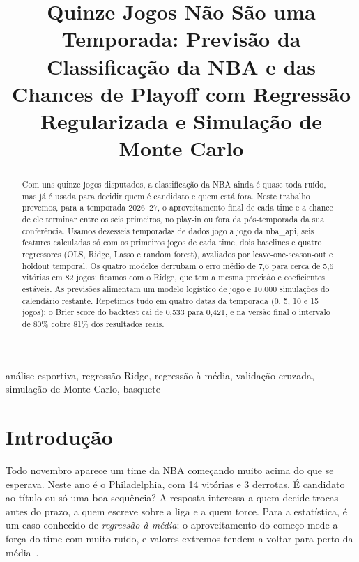 \documentclass[conference]{IEEEtran}
\begin{document}
\title{Quinze Jogos Não São uma Temporada: Previsão da Classificação da NBA e das Chances de Playoff com Regressão Regularizada e Simulação de Monte Carlo}

\author{
\and
{}
}

\maketitle

\begin{abstract}
Com uns quinze jogos disputados, a classificação da NBA ainda é quase toda ruído, mas já é usada para decidir quem é candidato e quem está fora. Neste trabalho prevemos, para a temporada 2026--27, o aproveitamento final de cada time e a chance de ele terminar entre os seis primeiros, no play-in ou fora da pós-temporada da sua conferência. Usamos dezesseis temporadas de dados jogo a jogo da nba\_api, seis features calculadas só com os primeiros jogos de cada time, dois baselines e quatro regressores (OLS, Ridge, Lasso e random forest), avaliados por leave-one-season-out e holdout temporal. Os quatro modelos derrubam o erro médio de 7,6 para cerca de 5,6 vitórias em 82 jogos; ficamos com o Ridge, que tem a mesma precisão e coeficientes estáveis. As previsões alimentam um modelo logístico de jogo e 10.000 simulações do calendário restante. Repetimos tudo em quatro datas da temporada (0, 5, 10 e 15 jogos): o Brier score do backtest cai de 0,533 para 0,421, e na versão final o intervalo de 80\% cobre 81\% dos resultados reais.
\end{abstract}

\begin{IEEEkeywords}
análise esportiva, regressão Ridge, regressão à média, validação cruzada, simulação de Monte Carlo, basquete
\end{IEEEkeywords}

\section{Introdução}
Todo novembro aparece um time da NBA começando muito acima do que se esperava. Neste ano é o Philadelphia, com 14 vitórias e 3 derrotas. É candidato ao título ou só uma boa sequência? A resposta interessa a quem decide trocas antes do prazo, a quem escreve sobre a liga e a quem torce. Para a estatística, é um caso conhecido de \emph{regressão à média}: o aproveitamento do começo mede a força do time com muito ruído, e valores extremos tendem a voltar para perto da média~\cite{efron1975,efron1977}.
\end{document}
